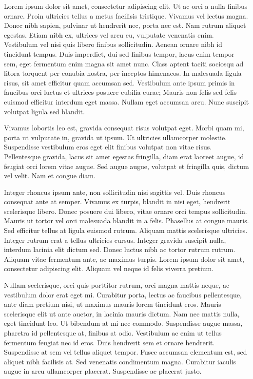\begin{abstracts}        %

Lorem ipsum dolor sit amet, consectetur adipiscing elit. Ut ac orci a nulla finibus ornare. Proin
ultricies tellus a metus facilisis tristique. Vivamus vel lectus magna. Donec nibh sapien, pulvinar
ut hendrerit nec, porta nec est. Nam rutrum aliquet egestas. Etiam nibh ex, ultrices vel arcu eu,
vulputate venenatis enim. Vestibulum vel nisi quis libero finibus sollicitudin. Aenean ornare nibh
id tincidunt tempus. Duis imperdiet, dui sed finibus tempor, lacus enim tempor sem, eget fermentum
enim magna sit amet nunc. Class aptent taciti sociosqu ad litora torquent per conubia nostra, per
inceptos himenaeos. In malesuada ligula risus, sit amet efficitur quam accumsan sed. Vestibulum ante
ipsum primis in faucibus orci luctus et ultrices posuere cubilia curae; Mauris non felis sed felis
euismod efficitur interdum eget massa. Nullam eget accumsan arcu. Nunc suscipit volutpat ligula sed
blandit.

Vivamus lobortis leo est, gravida consequat risus volutpat eget. Morbi quam mi, porta ut vulputate
in, gravida ut ipsum. Ut ultricies ullamcorper molestie. Suspendisse vestibulum eros eget elit
finibus volutpat non vitae risus. Pellentesque gravida, lacus sit amet egestas fringilla, diam erat
laoreet augue, id feugiat orci lorem vitae augue. Sed augue augue, volutpat et fringilla quis,
dictum vel velit. Nam et congue diam.

Integer rhoncus ipsum ante, non sollicitudin nisi sagittis vel. Duis rhoncus consequat ante at
semper. Vivamus ex turpis, blandit in nisi eget, hendrerit scelerisque libero. Donec posuere dui
libero, vitae ornare orci tempus sollicitudin. Mauris ut tortor vel orci malesuada blandit in a
felis. Phasellus at congue mauris. Sed efficitur tellus at ligula euismod rutrum. Aliquam mattis
scelerisque ultricies. Integer rutrum erat a tellus ultricies cursus. Integer gravida suscipit
nulla, interdum lacinia elit dictum sed. Donec luctus nibh ac tortor rutrum rutrum. Aliquam vitae
fermentum ante, ac maximus turpis. Lorem ipsum dolor sit amet, consectetur adipiscing elit. Aliquam
vel neque id felis viverra pretium.

Nullam scelerisque, orci quis porttitor rutrum, orci magna mattis neque, ac vestibulum dolor erat
eget mi. Curabitur porta, lectus ac faucibus pellentesque, ante diam pretium nisi, ut maximus mauris
lorem tincidunt eros. Mauris scelerisque elit ut ante auctor, in lacinia mauris dictum. Nam nec
mattis nulla, eget tincidunt leo. Ut bibendum at mi nec commodo. Suspendisse augue massa, pharetra
id pellentesque at, finibus at odio. Vestibulum ac enim ut tellus fermentum feugiat nec id eros.
Duis hendrerit sem et ornare hendrerit. Suspendisse at sem vel tellus aliquet tempor. Fusce accumsan
elementum est, sed aliquet nibh facilisis at. Sed venenatis condimentum magna. Curabitur iaculis
augue in arcu ullamcorper placerat. Suspendisse ac placerat justo.


\end{abstracts}
